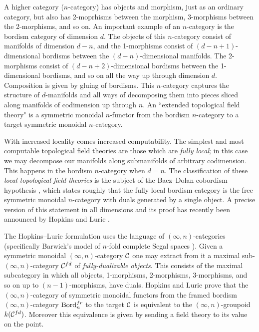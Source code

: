 \documentclass{amsart}
\begin{document}
A higher category ($n$-category) has objects and morphism, just as an ordinary category, but also has 2-moprhisms between the morphism, 3-morphisms between the 2-morphisms, and so on. An important example of an $n$-category is the bordism category of dimension $d$. The objects of this $n$-category consist of manifolds of dimension $d-n$, and the 1-morphisms consist of $(d-n +1)$-dimensional bordisms between the $(d-n)$-dimensional manifolds. The 2-morphisms consist of $(d-n +2)$-dimensional bordisms between the 1-dimensional bordisms, and so on all the way up through dimension $d$. Composition is given by gluing of bordisms. 
This $n$-category captures the structure of $d$-manifolds and all ways of decomposing them into pieces sliced along manifolds of codimension up through $n$. An ``extended  topological field theory" is a symmetric monoidal $n$-functor from the bordism $n$-category to a target symmetric monoidal $n$-category. 

With increased locality comes increased computability. The simplest and most computable topological field theories are those which are {\em fully local}; in this case we may decompose our manifolds along submanifolds of arbitrary codimension. This happens in the bordism $n$-category when $d=n$. The classification of these {\em local topological field theories} is the subject of the Baez--Dolan cobordism hypothesis \cite{MR1355899}, which states roughly that the fully local bordism category is the free symmetric monoidal $n$-category with duals generated by a single object. A precise version of this statement in all dimensions and its proof has recently been announced by Hopkins and Lurie \cite{MR2555928}.

The Hopkins--Lurie formulation uses the language of $(\infty, n)$-categories (specifically Barwick's model of $n$-fold complete Segal spaces \cite{Barwick:thesis}). Given a symmetric monoidal $(\infty, n)$-category $\mathcal C$ one may extract from it a maximal sub-$(\infty,n)$-category $\mathcal C^{fd}$ of {\em fully-dualizable objects}. This consists of the maximal subcategory in which  all objects, 1-morphisms, 2-morphisms, 3-morphisms, and so on up to $(n-1)$-morphisms, have duals. 
Hopkins and Lurie prove that the $(\infty,n)$-category of symmetric monoidal functors from the framed bordism $(\infty,n)$-category $\mathrm{Bord}^{fr}_n$ to the target $\mathcal C$ is equivalent to the $(\infty,n)$-groupoid $k(\mathcal C^{fd})$.  Moreover this equivalence is given by sending a field theory to its value on the point.
\end{document}
